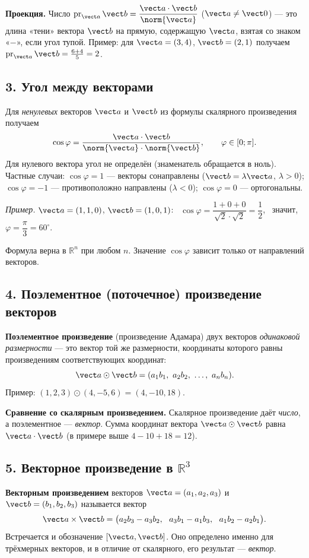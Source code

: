 \textbf{Проекция.} Число $\operatorname{pr}_{\vect a}\vect b=\dfrac{\vect a\cdot\vect b}{\norm{\vect a}}$ ($\vect a\ne\vect 0$) --- это длина «тени» вектора $\vect b$ на прямую, содержащую $\vect a$, взятая со знаком «$-$», если угол тупой. Пример: для $\vect a=(3,4)$, $\vect b=(2,1)$ получаем $\operatorname{pr}_{\vect a}\vect b=\frac{6+4}{5}=2$.

\subsection*{3. Угол между векторами}
Для \emph{ненулевых} векторов $\vect a$ и $\vect b$ из формулы скалярного произведения получаем
\[
\cos\varphi=\frac{\vect a\cdot\vect b}{\norm{\vect a}\cdot\norm{\vect b}},\qquad \varphi\in[0;\pi].
\]
Для нулевого вектора угол не определён (знаменатель обращается в ноль). Частные случаи: $\cos\varphi=1$ --- векторы сонаправлены ($\vect b=\lambda\vect a$, $\lambda>0$); $\cos\varphi=-1$ --- противоположно направлены ($\lambda<0$); $\cos\varphi=0$ --- ортогональны.

\textit{Пример.} $\vect a=(1,1,0)$, $\vect b=(1,0,1)$: \
$\cos\varphi=\dfrac{1+0+0}{\sqrt2\cdot\sqrt2}=\dfrac12$, \ значит, $\varphi=\dfrac{\pi}{3}=60^\circ$.

Формула верна в $\mathbb R^n$ при любом $n$. Значение $\cos\varphi$ зависит только от направлений векторов.

\subsection*{4. Поэлементное (поточечное) произведение векторов}
\textbf{Поэлементное произведение} (произведение Адамара) двух векторов \emph{одинаковой размерности} --- это вектор той же размерности, координаты которого равны произведениям соответствующих координат:
\[
\vect a\odot\vect b=(a_1b_1,\ a_2b_2,\ \dots,\ a_nb_n).
\]
Пример: $(1,2,3)\odot(4,-5,6)=(4,-10,18)$.

\textbf{Сравнение со скалярным произведением.} Скалярное произведение даёт \emph{число}, а поэлементное --- \emph{вектор}. Сумма координат вектора $\vect a\odot\vect b$ равна $\vect a\cdot\vect b$ (в примере выше $4-10+18=12$).

\subsection*{5. Векторное произведение в $\mathbb R^3$}
\textbf{Векторным произведением} векторов $\vect a=(a_1,a_2,a_3)$ и $\vect b=(b_1,b_2,b_3)$ называется вектор
\[
\vect a\times\vect b=\bigl(a_2b_3-a_3b_2,\ \ a_3b_1-a_1b_3,\ \ a_1b_2-a_2b_1\bigr).
\]
Встречается и обозначение $[\vect a,\vect b]$. Оно определено именно для трёхмерных векторов, и в отличие от скалярного, его результат --- \emph{вектор}.

